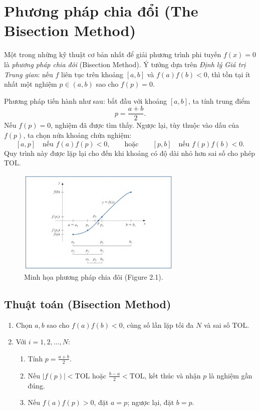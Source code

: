 \section{Phương pháp chia đổi (The Bisection Method)}

Một trong những kỹ thuật cơ bản nhất để giải phương trình phi tuyến $f(x) = 0$ là 
\textit{phương pháp chia đôi} (Bisection Method). 
Ý tưởng dựa trên \textit{Định lý Giá trị Trung gian}: 
nếu $f$ liên tục trên khoảng $[a,b]$ và $f(a)f(b) < 0$, 
thì tồn tại ít nhất một nghiệm $p \in (a,b)$ sao cho $f(p) = 0$.  

Phương pháp tiến hành như sau:  
bắt đầu với khoảng $[a,b]$, ta tính trung điểm
\[
p = \frac{a+b}{2}.
\]
Nếu $f(p) = 0$, nghiệm đã được tìm thấy. 
Ngược lại, tùy thuộc vào dấu của $f(p)$, ta chọn nửa khoảng chứa nghiệm:  
\[
[a,p] \quad \text{nếu } f(a)f(p)<0, 
\qquad \text{hoặc} \qquad
[p,b] \quad \text{nếu } f(p)f(b)<0.
\]
Quy trình này được lặp lại cho đến khi khoảng có độ dài nhỏ hơn sai số cho phép $\text{TOL}$.

\begin{figure}[h!]
\centering
\includegraphics[width=0.7\textwidth]{assets/figure2.1.png}
\caption{Minh họa phương pháp chia đôi (Figure 2.1).}
\label{fig:bisection-fig21}
\end{figure}

\subsection*{\textbf{Thuật toán (Bisection Method)}}

\begin{enumerate}
    \item Chọn $a, b$ sao cho $f(a)f(b)<0$, cùng số lần lặp tối đa $N$ và sai số $\text{TOL}$.
    \item Với $i=1,2,\dots,N$:
    \begin{enumerate}
        \item Tính $p = \tfrac{a+b}{2}$.
        \item Nếu $|f(p)| < \text{TOL}$ hoặc $\tfrac{b-a}{2} < \text{TOL}$, kết thúc và nhận $p$ là nghiệm gần đúng.
        \item Nếu $f(a)f(p)>0$, đặt $a=p$; ngược lại, đặt $b=p$.
    \end{enumerate}
\end{enumerate}

